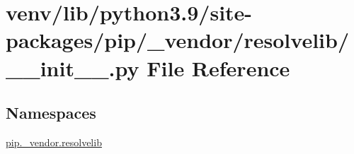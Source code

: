 \hypertarget{venv_2lib_2python3_89_2site-packages_2pip_2__vendor_2resolvelib_2____init_____8py}{}\section{venv/lib/python3.9/site-\/packages/pip/\+\_\+vendor/resolvelib/\+\_\+\+\_\+init\+\_\+\+\_\+.py File Reference}
\label{venv_2lib_2python3_89_2site-packages_2pip_2__vendor_2resolvelib_2____init_____8py}
\subsection*{Namespaces}
\begin{DoxyCompactItemize}
\item 
 \hyperlink{namespacepip_1_1__vendor_1_1resolvelib}{pip.\+\_\+vendor.\+resolvelib}
\end{DoxyCompactItemize}

